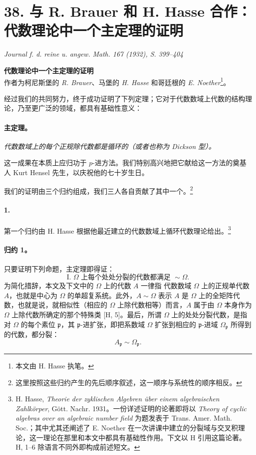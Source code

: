 \section*{38. 与 R. Brauer 和 H. Hasse 合作：代数理论中一个主定理的证明}

\begin{center}
\emph{Journal f. d. reine u. angew. Math. 167 (1932), S. 399--404}
\end{center}

\begin{center}
\textbf{代数理论中一个主定理的证明}\\[0.5em]
作者为柯尼斯堡的 \emph{R. Brauer}、马堡的 \emph{H. Hasse} 和哥廷根的 \emph{E. Noether}\footnote{本文由 H. Hasse 执笔。}。
\end{center}

经过我们的共同努力，终于成功证明了下列定理；它对于代数数域上代数的结构理论，乃至更广泛的领域，都具有基础性意义：

\paragraph{主定理。}
\emph{代数数域上的每个正规除代数都是循环的（或者也称为 Dickson 型）。}

这一成果在本质上应归功于 \(p\)-进方法。我们特别高兴地把它献给这一方法的奠基人 Kurt Hensel 先生，以庆祝他的七十岁生日。

我们的证明由三个归约组成，我们三人各自贡献了其中一个。\footnote{这里按照这些归约产生的先后顺序叙述，这一顺序与系统性的顺序相反。}

\paragraph{1.}
第一个归约由 H. Hasse 根据他最近建立的代数数域上循环代数理论给出。\footnote{H. Hasse, \emph{Theorie der zyklischen Algebren über einem algebraischen Zahlkörper}, Gött. Nachr. 1931。一份详述证明的论著即将以 \emph{Theory of cyclic algebras over an algebraic number field} 为题发表于 Trans. Amer. Math. Soc.；其中尤其还阐述了 E. Noether 在一次讲课中建立的分裂域与交叉积理论，这一理论在那里和本文中都具有基础性作用。下文以 H 引用这篇论著。H, 1--6 除语言不同外即构成前述短文。}

\paragraph{归约 1。}
只要证明下列命题，主定理即得证：
\[
\text{I. }\Omega\text{ 上每个处处分裂的代数都满足 } \sim \Omega .
\]
为简化措辞，本文及下文中的 \glqq{}\(\Omega\) 上的代数 \(A\)\grqq{} 一律指 \glqq{}代数数域 \(\Omega\) 上的正规单代数 \(A\)\grqq{}，也就是中心为 \(\Omega\) 的单超复系统。此外，\(A\sim\Omega\) 表示 \(A\) 是 \(\Omega\) 上的全矩阵代数，也就是说，就相似性（相应的 \(\Omega\) 上除代数相等）而言，\(A\) 属于由 \(\Omega\) 本身作为 \(\Omega\) 上除代数所确定的那个特殊类 [H, 5]。最后，所谓 \(\Omega\) 上的处处分裂代数，是指对 \(\Omega\) 的每个素位 \(\mathfrak p\)，其 \(\mathfrak p\)-进扩张，即把系数域 \(\Omega\) 扩张到相应的 \(\mathfrak p\)-进域 \(\Omega_{\mathfrak p}\) 所得到的代数，都分裂：
\[
A_{\mathfrak p}\sim \Omega_{\mathfrak p}.
\]


